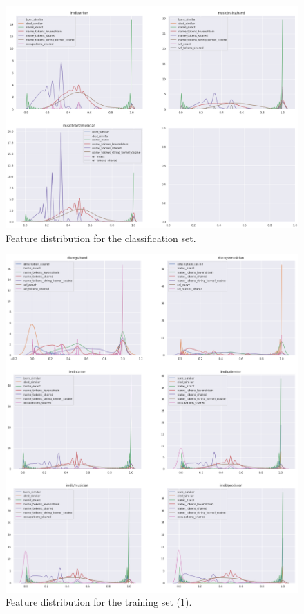 \documentclass[epsfig,a4paper,11pt,titlepage,twoside,openany]{book}
\begin{document}
\begin{figure}[H]
  \centering \includegraphics[width=\textwidth]{classification_feature_distribution_2} 
  \caption{Feature distribution for the classification set.}
  \label{fig:distribution-of-classification-features-2}
\end{figure}

\begin{figure}[H]
      \centering
      \includegraphics[width=\linewidth]{training_feature_distribution}
      \caption{Feature distribution for the training set (1).}
      \label{fig:distribution-of-training-features-1}
\end{figure}
\end{document}
